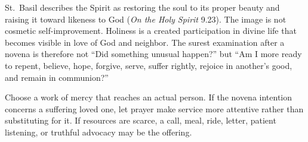 St.~Basil describes the Spirit as restoring the soul to its proper beauty and raising it toward likeness to God (\textit{On the Holy Spirit} 9.23). The image is not cosmetic self-improvement. Holiness is a created participation in divine life that becomes visible in love of God and neighbor. The surest examination after a novena is therefore not “Did something unusual happen?” but “Am I more ready to repent, believe, hope, forgive, serve, suffer rightly, rejoice in another's good, and remain in communion?”

Choose a work of mercy that reaches an actual person. If the novena intention concerns a suffering loved one, let prayer make service more attentive rather than substituting for it. If resources are scarce, a call, meal, ride, letter, patient listening, or truthful advocacy may be the offering.




